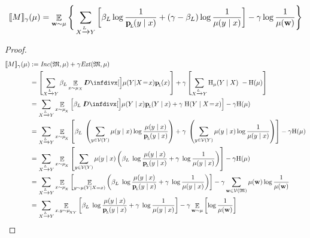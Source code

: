 \documentclass{article}
\newcommand{\ed}[3]{#2 \xrightarrow{\!\!\smash{#1}\vphantom{g}} #3}
\newcommand{\alle}[1][L]{_{ \ed {#1}XY}}
\newcommand{\dg}[1]{\mathfrak{#1}}
\def\extrsymb{\mathit{Ext}}
\def\inco{\mathit{Inc}}
\newcommand{\bp}[1][L]{\mat{p}_{\!_{#1}\!}}
\newcommand{\V}{\mathcal V}
\def\sheq{\!=\!}
\begin{document}
    \begin{prop}
        \[ \bbr{M}_\gamma(\mu)= \E_{\mat w \sim \mu} \Bigg\{   \sum_{ X \xrightarrow{\!\!L} Y  } \left[
            \beta_L \log \frac{1}{\bp(y\mid x)} + (\gamma - \beta_L ) \log \frac{1}{\mu(y \mid x)} \right] - \gamma \log \frac{1}{\mu(\mat w)} \Bigg\}  \]
    \end{prop}
    \begin{proof}
        \begin{align*}
            \bbr{M}_\gamma(\mu) &:= \inco(\dg M, \mu) + \gamma \extrsymb(\dg M, \mu) \\
                &= \left[\sum\alle \beta_L \E_{x\sim \mu_X}\kldiv[\Big]{ \mu(Y | X \sheq x) }{\bp(x) } \right]  + \gamma \left[\sum\alle \H_\mu(Y\mid X) ~-\H(\mu)\right]\\
                &= \sum\alle 
                    \E_{x \sim \mu_{\!_X}}  \left[ \beta_L\; \kldiv[\Big]{ \mu(Y \mid x) }{\bp(Y \mid x) } + \gamma \; \H(Y \mid X\sheq x) \right]  - \gamma \H(\mu) \\ 
                &= \sum\alle 
                    \E_{x \sim \mu_{\!_X}}  \left[ \beta_L\; \left(\sum_{y \in \V(Y)} \mu(y \mid x) \log\frac{\mu(y\mid x)}{\bp(y\mid x)}\right) + \gamma \; \left(\sum_{y \in \V(Y)} \mu(y\mid x) \log \frac{1}{\mu(y\mid x)} \right) \right]  - \gamma  \H(\mu) \\ 
                &= \sum\alle 
                    \E_{x \sim \mu_{\!_X}}  \left[ \sum_{y \in \V(Y)} \mu(y \mid x) \left(  \beta_L\; \log\frac{\mu(y\mid x)}{\bp(y\mid x)} + \gamma \; \log \frac{1}{\mu(y\mid x)} \right) \right]  - \gamma  \H(\mu) \\
                &= \sum\alle 
                    \E_{x \sim \mu_{\!_X}}  \left[ \E_{y \sim \mu(Y \mid X=x)} \left(  \beta_L\; \log\frac{\mu(y\mid x)}{\bp(y\mid x)} + \gamma \; \log \frac{1}{\mu(y\mid x)} \right) \right]  - \gamma \sum_{\mat w \in \V(\dg M)} \mu(\mat w) \log \frac{1}{\mu(\mat w)} \\  
                &= \sum\alle 
                    \E_{x,y \sim \mu_{\!_{XY}}}  \left[ \beta_L\; \log\frac{\mu(y\mid x)}{\bp(y\mid x)} + \gamma \; \log \frac{1}{\mu(y\mid x)}  \right]  - \gamma  \E_{\mat w \sim \mu} \left[ \log \frac{1}{\mu(\mat w)}\right] \\

\end{align*}
\end{proof}
\end{document}
